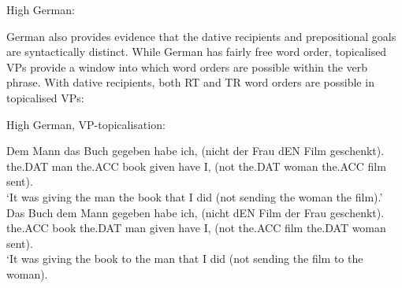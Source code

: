 \begin{exe}
	\ex High German:\label{ex:german-goals}
	\begin{xlist}
	\end{xlist}
\end{exe}

German also provides evidence that the dative recipients and prepositional goals are syntactically distinct. While German has fairly free word order, topicalised VPs provide a window into which word orders are possible within the verb phrase. With dative recipients, both RT and TR word orders are possible in topicalised VPs:

	\begin{exe}
		\ex\label{ex:german-VP-top} High German, VP-topicalisation:
		\begin{xlist}
			\ex \gll  Dem Mann das Buch gegeben habe ich, (nicht der Frau dEN Film geschenkt).\\
			the.DAT man the.ACC book given have I, (not the.DAT woman the.ACC film sent).\\
			\trans `It was giving the man the book that I did (not sending the woman the film).'
			\ex \gll Das Buch dem Mann gegeben habe ich, (nicht dEN Film der Frau geschenkt).\\
			the.ACC book the.DAT man given have I, (not the.ACC film the.DAT woman sent).\\
			\trans `It was giving the book to the man that I did (not sending the film to the woman).\\
		\end{xlist}
	\end{exe}

